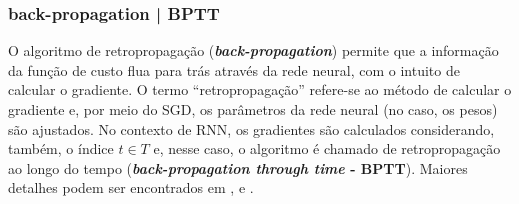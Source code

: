 \documentclass{automatextcc}
\begin{document}
\subsubsection{back-propagation | BPTT}
O algoritmo de retropropagação (\textbf{\textit{back-propagation}}) permite que a informação da função de custo flua para trás através da rede neural, com o intuito de calcular o gradiente. O termo ``retropropagação'' refere-se ao método de calcular o gradiente e, por meio do SGD, os parâmetros da rede neural (no caso, os pesos) são ajustados. No contexto de RNN, os gradientes são calculados considerando, também, o índice $t \in T$ e, nesse caso, o algoritmo é chamado de retropropagação ao longo do tempo (\textbf{\textit{back-propagation through time} - BPTT}). Maiores detalhes podem ser encontrados em \citet{haykin2008}, \citet{goodfellow2016} e \citet{fan2021}.  


\end{document}
